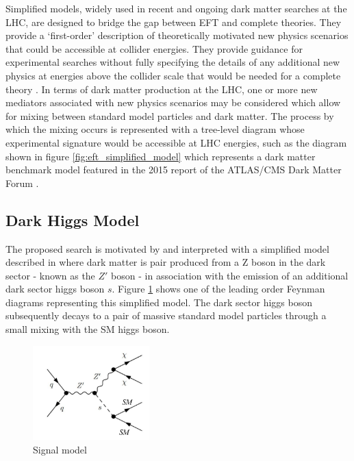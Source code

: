 \documentclass[12pt]{article}
\begin{document}
Simplified models, widely used in recent and ongoing dark matter searches at the LHC, are designed to bridge the gap between EFT and complete theories. They provide a `first-order' description of theoretically motivated new physics scenarios that could be accessible at collider energies. They provide guidance for experimental searches without fully specifying the details of any additional new physics at energies above the collider scale that would be needed for a complete theory \cite{DM_colliders}. In terms of dark matter production at the LHC, one or more new mediators associated with new physics scenarios may be considered which allow for mixing between standard model particles and dark matter. The process by which the mixing occurs is represented with a tree-level diagram whose experimental signature would be accessible at LHC energies, such as the diagram shown in figure \ref{fig:eft_simplified_model} which represents a dark matter benchmark model featured in the 2015 report of the ATLAS/CMS Dark Matter Forum \cite{dm_forum}.

\subsection{Dark Higgs Model}

The proposed search is motivated by and interpreted with a simplified model described in \cite{dark_higgs} where dark matter is pair produced from a Z boson in the dark sector - known as the $Z'$ boson - in association with the emission of an additional dark sector higgs boson $s$. Figure \ref{fig:signal_model} shows one of the leading order Feynman diagrams representing this simplified model. The dark sector higgs boson subsequently decays to a pair of massive standard model particles through a small mixing with the SM higgs boson. 

\begin{figure}[H]
	\centering
	\includegraphics[width=0.4\textwidth]{figures/Signal_generic.png}
	\caption[]{Signal model}
	\label{fig:signal_model}
\end{figure}
\end{document}
